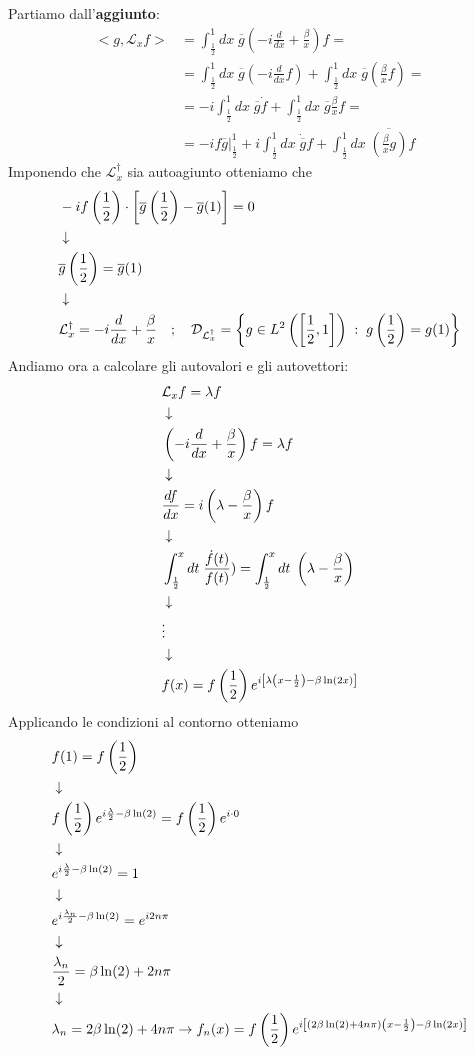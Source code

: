 Partiamo dall'\textbf{aggiunto}:
\begin{align}
	<g,\mathcal{L}_x f> &= \int_{\frac{1}{2}}^{1} dx \; \overline{g} \left(-i \frac{d}{dx} + \frac{\beta}{x}\right) f = \nonumber\\
	&= \int_{\frac{1}{2}}^{1} dx \; \overline{g} \left(-i \frac{d}{dx}f\right) + \int_{\frac{1}{2}}^{1} dx \; \overline{g}\left(\frac{\beta}{x} f\right) = \nonumber\\
	&=-i \int_{\frac{1}{2}}^{1} dx \; \overline{g} \dot{f} + \int_{\frac{1}{2}}^{1} dx \; \overline{g}\frac{\beta}{x}f = \nonumber\\
	&= \left. -i f \overline{g} \right|_{\frac{1}{2}}^{1} +i \int_{\frac{1}{2}}^{1} dx \;  \dot{\overline{g}}f + \int_{\frac{1}{2}}^{1} dx \; \overline{\left(\frac{\beta}{x} g\right)} f
\end{align}
Imponendo che $\mathcal{L}_x^\dagger$ sia autoagiunto otteniamo che
\begin{align}
	&-i f\left( \frac{1}{2} \right) \cdot\left[ \overline{g}\left(\frac{1}{2}\right) - \overline{g}(1) \right] = 0 \\ &\downarrow \nonumber \\
	&\overline{g}\left(\frac{1}{2}\right) = \overline{g}(1) \nonumber \\ &\downarrow \nonumber \\
	&\mathcal{L}_x^\dagger = -i \frac{d}{dx} + \frac{\beta}{x} \quad ; \quad \mathcal{D}_{\mathcal{L}_x^\dagger} = \left\{ g \in L^2 \left( \left[\frac{1}{2},1\right] \right) \; : \; g\left(\frac{1}{2}\right) = g(1) \right\}
\end{align}
Andiamo ora a calcolare gli autovalori e gli autovettori:
\begin{align}
	&\mathcal{L}_x f= \lambda f \\ &\downarrow \nonumber \\
	&\left( -i \frac{d}{dx} + \frac{\beta}{x} \right) f = \lambda f\nonumber \\ &\downarrow \nonumber \\
	&\frac{df}{dx} = i\left( \lambda - \frac{\beta}{x} \right) f \nonumber \\ &\downarrow \nonumber \\
	&\int_{\frac{1}{2}}^{x} dt \; \frac{\dot{f}(t)}{f(t)} ) = \int_{\frac{1}{2}}^{x} dt \; \left( \lambda - \frac{\beta}{x} \right) \nonumber \\ &\downarrow \nonumber \\
	&\vdots\nonumber \\ &\downarrow \nonumber \\
	&f(x) = f\left(\frac{1}{2}\right) e^{i\left[ \lambda \left( x - \frac{1}{2} \right)  - \beta \ln(2x)\right]}
\end{align}
Applicando le condizioni al contorno otteniamo
\begin{align}
	&f(1) =  f\left(\frac{1}{2}\right) \\ &\downarrow \nonumber \\
	&f\left(\frac{1}{2}\right) e^{i\frac{\lambda}{2}  - \beta \ln(2)} = f\left(\frac{1}{2}\right) e^{i\cdot 0}\nonumber \\ &\downarrow \nonumber \\
	&e^{i\frac{\lambda}{2}  - \beta \ln(2)} = 1 \nonumber \\ &\downarrow \nonumber \\
	&e^{i\frac{\lambda_n}{2}  - \beta \ln(2)} = e^{i2n\pi} \nonumber \\ &\downarrow \nonumber \\
	&\frac{\lambda_n}{2}  = \beta \ln(2) + 2n\pi \nonumber \\ &\downarrow \nonumber \\
	&\lambda_n = 2\beta \ln(2) + 4n\pi \to f_n(x) = f\left(\frac{1}{2}\right) e^{i\left[ (2\beta \ln(2) + 4n\pi) \left( x - \frac{1}{2} \right) - \beta \ln(2x)\right]}
\end{align}

\newpage
